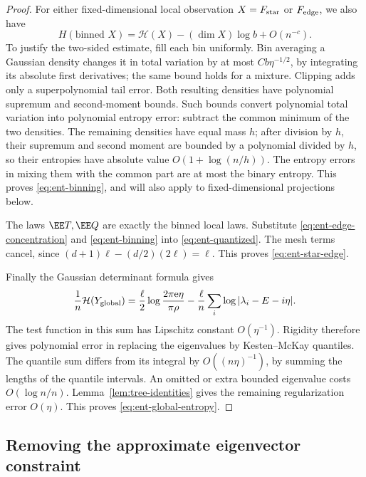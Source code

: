 \begin{proof}
For either fixed-dimensional local observation \(X=F_{\rm star}\)
or \(F_{\rm edge}\), we also have
\begin{equation}\label{eq:ent-binning}
 H(\text{binned }X)
 =\mathcal H(X)-(\dim X)\log b+O(n^{-c}).
\end{equation}
To justify the two-sided estimate, fill each bin uniformly.
Bin averaging a Gaussian density changes it in total variation by
at most \(Cb\eta^{-1/2}\), by integrating its absolute first
derivatives; the same bound holds for a mixture. Clipping adds only
a superpolynomial tail error. Both resulting densities have
polynomial supremum and second-moment bounds.
Such bounds convert polynomial total variation into polynomial
entropy error: subtract the common minimum of the two densities.
The remaining densities have equal mass \(h\); after division by
\(h\), their supremum and second moment are bounded by a polynomial
divided by \(h\), so their entropies have absolute value
\(O(1+\log(n/h))\). The entropy errors in mixing them with the
common part are at most the binary entropy. This proves
\eqref{eq:ent-binning}, and will also apply to fixed-dimensional
projections below.

The laws \(\EE T,\EE Q\) are exactly the binned local laws.
Substitute \eqref{eq:ent-edge-concentration} and
\eqref{eq:ent-binning} into \eqref{eq:ent-quantized}.
The mesh terms cancel, since
\((d+1)\ell-(d/2)(2\ell)=\ell\).
This proves \eqref{eq:ent-star-edge}.

Finally the Gaussian determinant formula gives
\[
 \frac1n\mathcal H(Y_{\rm global})
 =\frac{\ell}{2}\log\frac{2\pi{\rm e}\eta}{\pi\rho}
       -\frac{\ell}{n}\sum_i\log|\lambda_i-E-i\eta|.
\]
The test function in this sum has Lipschitz constant \(O(\eta^{-1})\).
Rigidity therefore gives polynomial error in replacing the eigenvalues
by Kesten--McKay quantiles. The quantile sum differs from its integral
by \(O((n\eta)^{-1})\), by summing the lengths of the quantile
intervals. An omitted or extra bounded eigenvalue costs
\(O(\log n/n)\). Lemma~\ref{lem:tree-identities} gives the remaining
regularization error \(O(\eta)\). This proves
\eqref{eq:ent-global-entropy}.
\end{proof}

\subsection{Removing the approximate eigenvector constraint}

